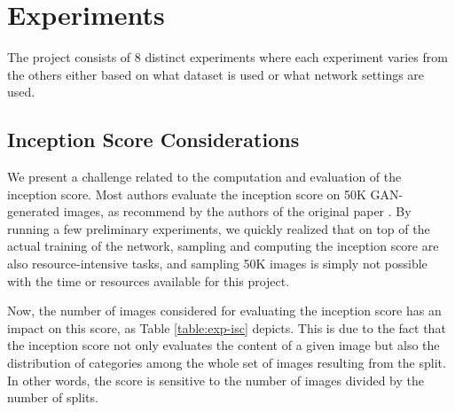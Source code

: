 
\section{Experiments}
The project consists of 8 distinct experiments where each experiment varies from the others either based on what dataset is used or what network settings are used.

\subsection{Inception Score Considerations}

We present a challenge related to the computation and evaluation of the inception score. Most authors evaluate the inception score on 50K GAN-generated images, as recommend by the authors of the original paper \cite{salimans2016improved}. By running a few preliminary experiments, we quickly realized that on top of the actual training of the network, sampling and computing the inception score are also resource-intensive tasks, and sampling 50K images is simply not possible with the time or resources available for this project.


Now, the number of images considered for evaluating the inception score has an impact on this score, as Table \ref{table:exp-isc} depicts. This is due to the fact that the inception score not only evaluates the content of a given image but also the distribution of categories among the whole set of images resulting from the split. In other words, the score is sensitive to the number of images divided by the number of splits. 


